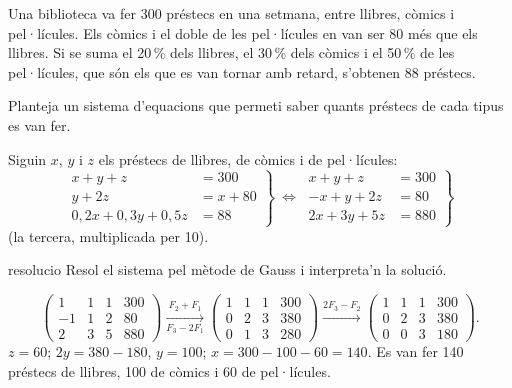 Una biblioteca va fer 300 préstecs en una setmana, entre llibres, còmics i pel·lícules. Els còmics i el
doble de les pel·lícules en van ser 80 més que els llibres. Si se suma el 20\,\% dels llibres, el 30\,\%
dels còmics i el 50\,\% de les pel·lícules, que són els que es van tornar amb retard, s'obtenen 88
préstecs.

\begin{apartats}

Planteja un sistema d'equacions que permeti saber quants préstecs de cada tipus es van fer.

\begin{solucio}
Siguin $x$, $y$ i $z$ els préstecs de llibres, de còmics i de pel·lícules:
\[
\left.\begin{aligned}x+y+z&=300\\y+2z&=x+80\\0{,}2x+0{,}3y+0{,}5z&=88\end{aligned}\right\}
\ \Longleftrightarrow\
\left.\begin{aligned}x+y+z&=300\\-x+y+2z&=80\\2x+3y+5z&=880\end{aligned}\right\}
\]
(la tercera, multiplicada per 10).
\end{solucio}

\begin{tria}{resolucio}
Resol el sistema pel mètode de Gauss i interpreta'n la solució.

\begin{solucio}
\[
\left(\begin{array}{ccc|c}1&1&1&300\\-1&1&2&80\\2&3&5&880\end{array}\right)
\xrightarrow[F_3-2F_1]{F_2+F_1}
\left(\begin{array}{ccc|c}1&1&1&300\\0&2&3&380\\0&1&3&280\end{array}\right)
\xrightarrow{2F_3-F_2}
\left(\begin{array}{ccc|c}1&1&1&300\\0&2&3&380\\0&0&3&180\end{array}\right).
\]
$z=60$; $2y=380-180$, $y=100$; $x=300-100-60=140$. Es van fer 140 préstecs de llibres, 100 de còmics
i 60 de pel·lícules.
\end{solucio}


\end{tria}
\end{apartats}
